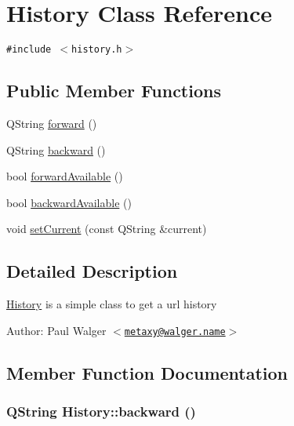 \hypertarget{classHistory}{
\section{History Class Reference}
\label{classHistory}
}
{\tt \#include $<$history.h$>$}

\subsection*{Public Member Functions}
\begin{CompactItemize}
\item 
QString \hyperlink{classHistory_83d69c4bfe79d19a6187f586e7311b22}{forward} ()
\item 
QString \hyperlink{classHistory_41c8d23cb2789b07bc6229b203bafce3}{backward} ()
\item 
bool \hyperlink{classHistory_1227493ba04f3f640c6648b9562bf68e}{forwardAvailable} ()
\item 
bool \hyperlink{classHistory_c8c3f249e76605c9686eacb4716c79b4}{backwardAvailable} ()
\item 
void \hyperlink{classHistory_7fd72e5b7289c61f32ec5d533d0356bf}{setCurrent} (const QString \&current)
\end{CompactItemize}


\subsection{Detailed Description}
\hyperlink{classHistory}{History} is a simple class to get a url history

\begin{Desc}
\item[Author:]Paul Walger $<$\href{mailto:metaxy@walger.name}{\tt metaxy@walger.name}$>$ \end{Desc}


\subsection{Member Function Documentation}
\hypertarget{classHistory_41c8d23cb2789b07bc6229b203bafce3}{
\subsubsection[{backward}]{\setlength{\rightskip}{0pt plus 5cm}QString History::backward ()}}
\label{classHistory_41c8d23cb2789b07bc6229b203bafce3}


